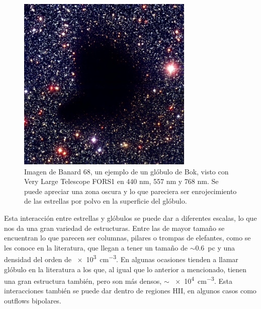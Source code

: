 \documentclass{article}
\begin{document}
\begin{figure}[h]
    \centering
    \includegraphics[width=0.75\textwidth]{images Chapter 1/C1_Bok_globule.jpg}
    \caption{Imagen de Banard 68, un ejemplo de un glóbulo de Bok, visto con Very Large Telescope FORS1 en 440 nm, 557 nm y 768 nm. Se puede apreciar una zona oscura y lo que pareciera ser enrojecimiento de las estrellas por polvo en la superficie del glóbulo.}
    \label{fig:zones}
\end{figure}

Esta interacción entre estrellas y glóbulos se puede dar a diferentes escalas, lo que nos da una gran variedad de estructuras. Entre las de mayor tamaño se encuentran lo que parecen ser columnas, pilares o trompas de elefantes, como se les conoce en la literatura, que llegan a tener un tamaño de $\sim$\SI{0.6}{pc} y una densidad del orden de \SI{e3}{cm^{-3}}. En algunas ocasiones tienden a llamar glóbulo en la literatura a los que, al igual que lo anterior a mencionado, tienen una gran estructura también, pero son más densos, $\sim$ \SI{e4}{cm^{-3}}. Esta interacciones también se puede dar dentro de regiones HII, en algunos casos como outflows bipolares.
\end{document}
